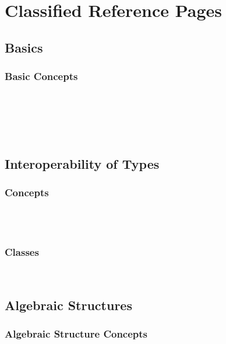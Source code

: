 




\section{Classified Reference Pages}
\label{caf_ref::classified_refernce_pages}

\subsection*{Basics}
\label{caf_ref::basics}

\subsubsection*{Basic Concepts}
\\
\\
\\
\\



\subsection*{Interoperability of Types}
\subsubsection*{Concepts}
\\
\\
\subsubsection*{Classes}
\\


\subsection*{Algebraic Structures}
\label{caf_ref::algebraic_structures}

\subsubsection*{Algebraic Structure Concepts}

